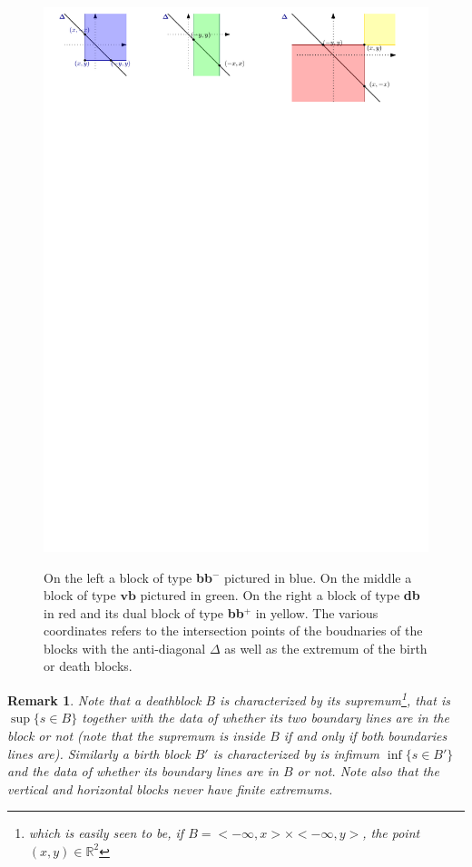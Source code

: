 \documentclass[a4paper, english, 11pt]{article}
\newcommand{\0}{\vec{0}}
\newcommand{\R}[0]{\mathbb{R}}
\newtheorem{remark}[prop]{Remark}
\begin{document}
\begin{figure}
\begin{center}
\includegraphics[scale=0.9]{Blocks.pdf}\label{fig:blocks}
\caption{On the left a block of type \textbf{bb}$^{-}$ pictured in blue. On the middle a block of type $\textbf{vb}$ pictured in green. On the right 
a block of type \textbf{db} in red and its dual block of type \textbf{bb}$^{+}$ in yellow.
The various coordinates refers to the intersection points of the boudnaries of the blocks with the anti-diagonal $\Delta$ as well as the extremum of the birth or death blocks.}
\end{center}
\end{figure}
\begin{remark}\label{R;dualBlocks}
Note that a deathblock $B$ is characterized by its supremum\footnote{which is easily seen to be, if $B= <-\infty, x> \times <-\infty,y>$, the point $(x,y)\in \R^2$}, that is $\sup \{s\in B\}$ together with the data of whether its two boundary lines are in the block or not (note that the supremum is inside $B$ if and only if both boundaries lines are). 
Similarly a birth block $B'$  is characterized by is infimum $\inf \{s\in B'\}$ and the data of whether its boundary lines are in $B$ or not.  Note also that the vertical and horizontal blocks never have finite extremums.  
\end{remark}
\end{document}
